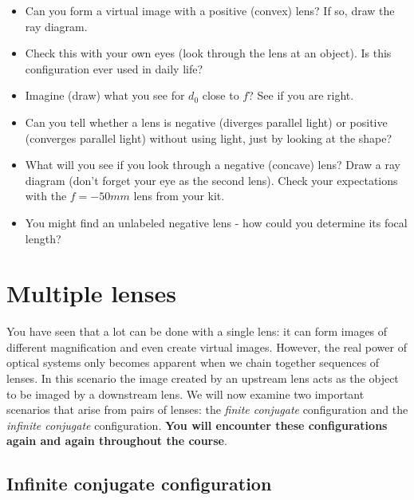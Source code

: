 \documentclass[a4paper]{report}
\begin{document}
    \begin{itemize}
        \item Can you form a virtual image with a positive (convex) lens? If so, draw the ray diagram.
        \item Check this with your own eyes (look through the lens at an object). Is this configuration ever used in daily life?
        \item Imagine (draw) what you see for $d_0$ close to $f$? See if you are right.
        \item Can you tell whether a lens is negative (diverges parallel light) or positive (converges parallel light) without using light, just by looking at the shape?
        \item What will you see if you look through a negative (concave) lens? Draw a ray diagram (don't forget your eye as the second lens). Check your expectations with the $f=-50mm$ lens from your kit.
        \item You might find an unlabeled negative lens - how could you determine its focal length?
    \end{itemize}

    \clearpage


	\section{Multiple lenses}

	You have seen that a lot can be done with a single lens: it can form images of different magnification and even create virtual images.
	However, the real power of optical systems only becomes apparent when we chain together sequences of lenses.
	In this scenario the image created by an upstream lens acts as the object to be imaged by a downstream lens.
	We will now examine two important scenarios that arise from pairs of lenses: the \emph{finite conjugate} configuration and the \emph{infinite conjugate} configuration.
	\textbf{You will encounter these configurations again and again throughout the course}.

	\subsection{Infinite conjugate configuration}
	\hypertarget{hintBack-infinite}{}
\end{document}
